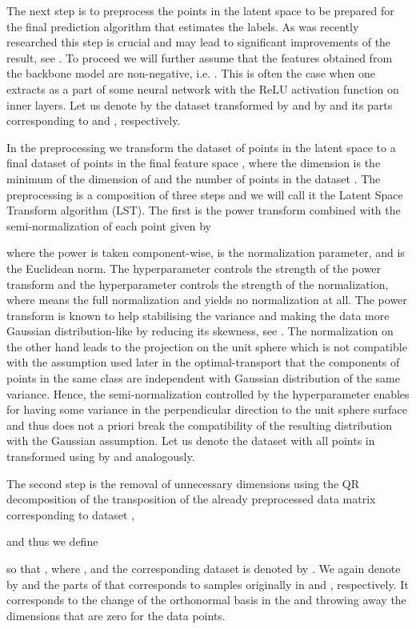 \documentclass[letterpaper]{article} \usepackage{aaai20}  \usepackage{times}  \usepackage{helvet} \usepackage{courier}  \usepackage[hyphens]{url}  \usepackage{graphicx} \urlstyle{rm} \def\UrlFont{\rm}  \usepackage{graphicx}  \frenchspacing  \setlength{\pdfpagewidth}{8.5in}  \setlength{\pdfpageheight}{11in}  \usepackage[ruled,vlined]{algorithm2e}
\begin{document}
The next step is to preprocess the points in the latent space to be prepared for the final prediction algorithm that estimates the labels.
As was recently researched this step is crucial and may lead to significant improvements of the result, see \cite{wang2019simpleshot}.
To proceed we will further assume that the features obtained from the backbone model  are non-negative, i.e. . 
This is often the case when one extracts  as a part of some neural network with the ReLU activation function on inner layers. 
Let us denote by  the dataset  transformed by  and by  and  its parts corresponding to  and , respectively.

In the preprocessing we transform the dataset  of points in the latent space  to a final dataset  of points in the final 
feature space , where the dimension 
 is the minimum of the dimension  of  and the number of points in the dataset .
The preprocessing is a composition of three steps and we will call it the Latent Space Transform algorithm (LST). The first is the power transform combined with the semi-normalization of each point given by

where the power is taken component-wise,  is the normalization parameter, and  is the Euclidean norm.
The hyperparameter  controls the strength of the power transform and the hyperparameter  controls the strength of 
the normalization, where  means the full normalization and  yields no normalization at all.
The power transform is known to help stabilising the variance and making the data more Gaussian distribution-like by reducing its skewness, see \cite{boxcox1964}.
The normalization on the other hand leads to the projection on the unit sphere which is not compatible with the assumption used later in the optimal-transport that the components of points in the same class are independent with Gaussian distribution of the same variance.
Hence, the semi-normalization controlled by the hyperparameter  enables for having some variance in the perpendicular 
direction to the unit sphere surface and thus does not a priori break the compatibility of the resulting distribution with the Gaussian assumption.
Let us denote the dataset with all points in  transformed using  by  and  analogously.

The second step is the removal of unnecessary dimensions using the QR decomposition of the transposition of the already preprocessed data matrix 
 corresponding to dataset ,

and thus we define

so that , where , and the corresponding dataset is denoted by .
We again denote by  and  the parts of  that corresponds to samples originally in  and , respectively.
It corresponds to the change of the orthonormal basis in the  and throwing away the dimensions that are zero for the data points.
\end{document}
